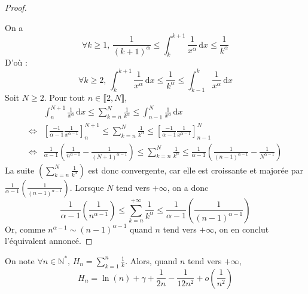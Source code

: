 \begin{proof}
\begin{center}
\begin{tikzpicture}[scale=1.5]
      \end{tikzpicture}
    \end{center}
    On a
    \[ \forall k \geq 1, \, \frac{1}{(k+1)^\alpha} \leq \int_k^{k+1} \frac{1}{x^\alpha} \, \mathrm{d}x \leq \frac{1}{k^\alpha} \]
    D'où :
    \[ \forall k \geq 2, \, \int_k^{k+1} \frac{1}{x^\alpha} \, \mathrm{d}x \leq \frac{1}{k^\alpha} \leq \int_{k-1}^k \frac{1}{x^\alpha} \, \mathrm{d}x \]
    Soit $N \geq 2$. Pour tout $n \in \llbracket 2, N \rrbracket$,
    \begin{align*}
      &\int_n^{N+1} \frac{1}{x^\alpha} \, \mathrm{d}x \leq \sum_{k=n}^N \frac{1}{k^\alpha} \leq \int_{n-1}^N \frac{1}{x^\alpha} \, \mathrm{d}x \\
      \iff& \left[ \frac{-1}{\alpha - 1} \frac{1}{x^{\alpha - 1}} \right]^{N+1}_n \leq \sum_{k=n}^N \frac{1}{k^\alpha} \leq \left[ \frac{-1}{\alpha - 1} \frac{1}{x^{\alpha - 1}} \right]^N_{n-1} \\
      \iff& \frac{1}{\alpha - 1} \left( \frac{1}{n^{\alpha - 1}} - \frac{1}{(N+1)^{\alpha - 1}} \right) \leq \sum_{k=n}^N \frac{1}{k^\alpha} \leq \frac{1}{\alpha - 1} \left( \frac{1}{(n-1)^{\alpha - 1}} - \frac{1}{N^{\alpha - 1}} \right)
    \end{align*}
    La suite $\left(\sum_{k=n}^N \frac{1}{k^\alpha} \right)$ est donc convergente, car elle est croissante et majorée par $\frac{1}{\alpha - 1} \left( \frac{1}{(n-1)^{\alpha - 1}} \right)$. Lorsque $N$ tend vers $+\infty$, on a donc
    \[ \frac{1}{\alpha - 1} \left( \frac{1}{n^{\alpha - 1}} \right) \leq \sum_{k=n}^{+\infty} \frac{1}{k^\alpha} \leq \frac{1}{\alpha - 1} \left( \frac{1}{(n-1)^{\alpha - 1}} \right) \]
    Or, comme $n^{\alpha - 1} \sim (n-1)^{\alpha - 1}$ quand $n$ tend vers $+\infty$, on en conclut l'équivalent annoncé.
  \end{proof}

  \begin{theorem}
    On note $\forall n \in \mathbb{N}^*, \, H_n = \sum_{k=1}^{n} \frac{1}{k}$. Alors, quand $n$ tend vers $+\infty$,
    \[ H_n = \ln(n) + \gamma + \frac{1}{2n} - \frac{1}{12n^2} + o\left( \frac{1}{n^2} \right) \]
  \end{theorem}

